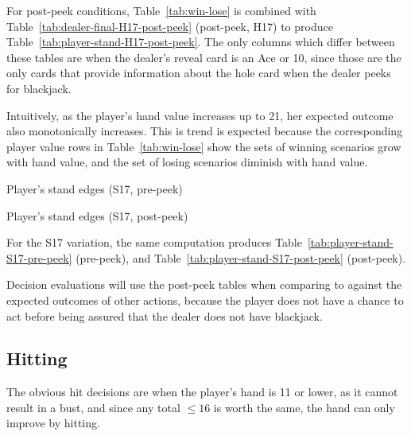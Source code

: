 For post-peek conditions, Table~\ref{tab:win-lose} is combined with
Table~\ref{tab:dealer-final-H17-post-peek} (post-peek, H17) to produce
Table~\ref{tab:player-stand-H17-post-peek}.
The only columns which differ between these tables are when
the dealer's reveal card is an Ace or 10, since those are the only cards
that provide information about the hole card
when the dealer peeks for blackjack.

Intuitively, as the player's hand value increases up to 21, 
her expected outcome also monotonically increases.
This is trend is expected because the corresponding player value rows in
Table~\ref{tab:win-lose} show the sets of winning scenarios
grow with hand value, and the set of losing scenarios diminish with
hand value.  

\begin{table}[ht!]
\caption{Player's stand edges (S17, pre-peek)}
\begin{center}

\end{center}
\label{tab:player-stand-S17-pre-peek}
\end{table}

\begin{table}[ht!]
\caption{Player's stand edges (S17, post-peek)}
\begin{center}

\end{center}
\label{tab:player-stand-S17-post-peek}
\end{table}

For the S17 variation, the same computation produces
Table~\ref{tab:player-stand-S17-pre-peek} (pre-peek), and
Table~\ref{tab:player-stand-S17-post-peek} (post-peek).

Decision evaluations will use the post-peek tables when
comparing to against the expected outcomes of other actions, 
because the player does not have a chance to act before
being assured that the dealer does not have blackjack.  

\subsection{Hitting}
\label{sec:basic:hit-stand:hit}

The obvious hit decisions are when the player's hand is 11 or lower,
as it cannot result in a bust, and since any total $\le{}16$ is
worth the same, the hand can only improve by hitting.  

